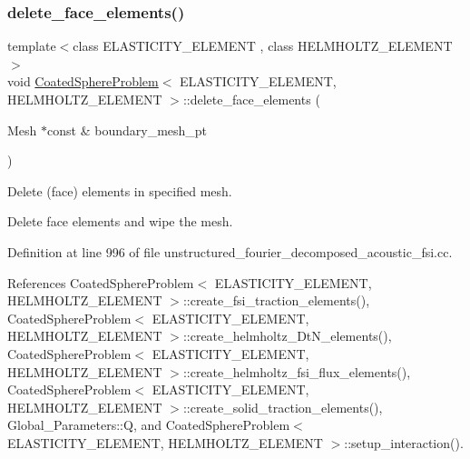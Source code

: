 \mbox{\label{classCoatedSphereProblem_a1092568f8c12afcefe7cbf56ebbb115c}} 
\subsubsection{\texorpdfstring{delete\+\_\+face\+\_\+elements()}{delete\_face\_elements()}}
{\footnotesize\ttfamily template$<$class E\+L\+A\+S\+T\+I\+C\+I\+T\+Y\+\_\+\+E\+L\+E\+M\+E\+NT , class H\+E\+L\+M\+H\+O\+L\+T\+Z\+\_\+\+E\+L\+E\+M\+E\+NT $>$ \\
void \hyperlink{classCoatedSphereProblem}{Coated\+Sphere\+Problem}$<$ E\+L\+A\+S\+T\+I\+C\+I\+T\+Y\+\_\+\+E\+L\+E\+M\+E\+NT, H\+E\+L\+M\+H\+O\+L\+T\+Z\+\_\+\+E\+L\+E\+M\+E\+NT $>$\+::delete\+\_\+face\+\_\+elements (\begin{DoxyParamCaption}\item[{Mesh $\ast$const \&}]{boundary\+\_\+mesh\+\_\+pt }\end{DoxyParamCaption})\hspace{0.3cm}{\ttfamily [private]}}



Delete (face) elements in specified mesh. 

Delete face elements and wipe the mesh. 

Definition at line 996 of file unstructured\+\_\+fourier\+\_\+decomposed\+\_\+acoustic\+\_\+fsi.\+cc.



References Coated\+Sphere\+Problem$<$ E\+L\+A\+S\+T\+I\+C\+I\+T\+Y\+\_\+\+E\+L\+E\+M\+E\+N\+T, H\+E\+L\+M\+H\+O\+L\+T\+Z\+\_\+\+E\+L\+E\+M\+E\+N\+T $>$\+::create\+\_\+fsi\+\_\+traction\+\_\+elements(), Coated\+Sphere\+Problem$<$ E\+L\+A\+S\+T\+I\+C\+I\+T\+Y\+\_\+\+E\+L\+E\+M\+E\+N\+T, H\+E\+L\+M\+H\+O\+L\+T\+Z\+\_\+\+E\+L\+E\+M\+E\+N\+T $>$\+::create\+\_\+helmholtz\+\_\+\+Dt\+N\+\_\+elements(), Coated\+Sphere\+Problem$<$ E\+L\+A\+S\+T\+I\+C\+I\+T\+Y\+\_\+\+E\+L\+E\+M\+E\+N\+T, H\+E\+L\+M\+H\+O\+L\+T\+Z\+\_\+\+E\+L\+E\+M\+E\+N\+T $>$\+::create\+\_\+helmholtz\+\_\+fsi\+\_\+flux\+\_\+elements(), Coated\+Sphere\+Problem$<$ E\+L\+A\+S\+T\+I\+C\+I\+T\+Y\+\_\+\+E\+L\+E\+M\+E\+N\+T, H\+E\+L\+M\+H\+O\+L\+T\+Z\+\_\+\+E\+L\+E\+M\+E\+N\+T $>$\+::create\+\_\+solid\+\_\+traction\+\_\+elements(), Global\+\_\+\+Parameters\+::Q, and Coated\+Sphere\+Problem$<$ E\+L\+A\+S\+T\+I\+C\+I\+T\+Y\+\_\+\+E\+L\+E\+M\+E\+N\+T, H\+E\+L\+M\+H\+O\+L\+T\+Z\+\_\+\+E\+L\+E\+M\+E\+N\+T $>$\+::setup\+\_\+interaction().




